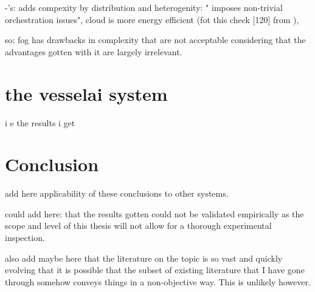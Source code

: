 -'s: adds compexity by distribution and heterogenity: " imposes non-trivial orchestration issues", cloud is more energy efficient (fot this check [120] from \cite{fogsurvey}),

so: fog has drawbacks in complexity that are not acceptable considering that the advantages gotten with it are largely irrelevant.

\chapter{the vesselai system}

i e the results i get

\chapter{Conclusion}

add here applicability of these conclusions to other systems.

could add here: that the results gotten could not be validated empirically as the scope and level of this thesis will not allow for a thorough experimental inspection.

also add maybe here that the literature on the topic is so vast and quickly evolving that it is possible that the subset of existing literature that I have gone through somehow conveys things in a non-objective way. This is unlikely however.
